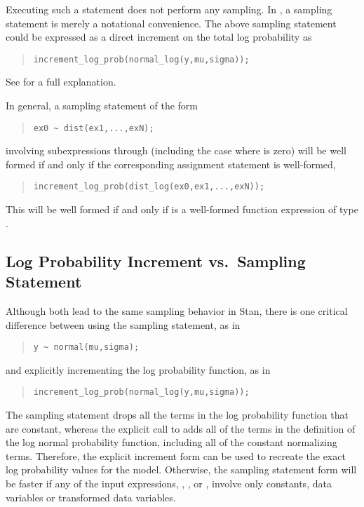 Executing such a statement does not perform any sampling.  In \Stan, a
sampling statement is merely a notational convenience.  The above
sampling statement could be expressed as a direct increment on the
total log probability as
%
\begin{quote}
\begin{Verbatim}[fontsize=\small]
increment_log_prob(normal_log(y,mu,sigma));
\end{Verbatim}
\end{quote}
%
See  for a full explanation.

In general, a sampling statement of the form
%
\begin{quote}
\begin{Verbatim}[fontsize=\small]
ex0 ~ dist(ex1,...,exN);
\end{Verbatim}
\end{quote}
%
involving subexpressions  through  (including the
case where  is zero) will be well formed if and only if the
corresponding assignment statement is well-formed,
%
\begin{quote}
\begin{Verbatim}[fontsize=\small]
increment_log_prob(dist_log(ex0,ex1,...,exN));
\end{Verbatim}
\end{quote}
%
This will be well formed if and only if
 is a well-formed function expression
of type .

\subsection{Log Probability Increment vs.\ Sampling Statement}\label{incr-vs-sample.section}

Although both lead to the same sampling behavior in Stan, there is one
critical difference between using the sampling statement, as in
%
\begin{quote}
\begin{Verbatim}[fontsize=\small]
y ~ normal(mu,sigma);
\end{Verbatim}
\end{quote}
%
and explicitly incrementing the log probability function, as in
%
\begin{quote}
\begin{Verbatim}[fontsize=\small]
increment_log_prob(normal_log(y,mu,sigma));
\end{Verbatim}
\end{quote}
%
The sampling statement drops all the terms in the log probability
function that are constant, whereas the explicit call to
 adds all of the terms in the definition of the log
normal probability function, including all of the constant normalizing
terms.  Therefore, the explicit increment form can be used to recreate
the exact log probability values for the model.  Otherwise, the
sampling statement form will be faster if any of the input expressions,
, , or , involve only constants, data
variables or transformed data variables. 


